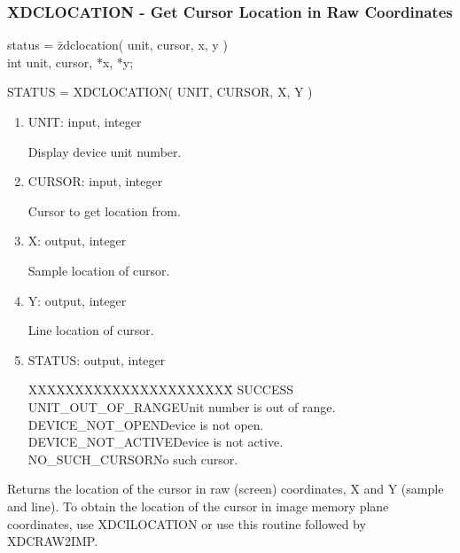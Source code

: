\subsubsection{XDCLOCATION - Get Cursor Location in Raw Coordinates}
\begin{tabbing}
status = \=zdclocation( unit, cursor, x, y )\\
\>int  unit, cursor, *x, *y;\\
\end{tabbing}
STATUS = XDCLOCATION( UNIT, CURSOR, X, Y )
\begin{enumerate}
\item UNIT:  input, integer

Display device unit number.
\item CURSOR:  input, integer

Cursor to get location from.
\item X:  output, integer

Sample location of cursor.
\item Y:  output, integer

Line location of cursor.
\item STATUS:  output, integer
\begin{tabbing}
XXXXXXXXXXXXXXXXXXXXXX\=\kill
SUCCESS\\
UNIT\_OUT\_OF\_RANGE\>Unit number is out of range.\\
DEVICE\_NOT\_OPEN\>Device is not open.\\
DEVICE\_NOT\_ACTIVE\>Device is not active.\\
NO\_SUCH\_CURSOR\>No such cursor.\\
\end{tabbing}
\end{enumerate}
Returns the location of the cursor in raw (screen) coordinates, X and Y
(sample and line).  To obtain the location of the cursor in image memory
plane coordinates, use XDCILOCATION or use this routine followed by
XDCRAW2IMP.
\newpage

